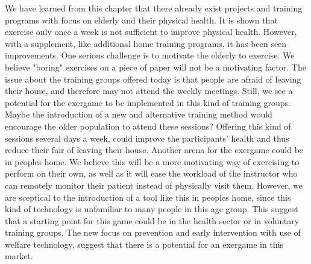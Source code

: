 We have learned from this chapter that there already exist projects and training programs with focus on elderly and their physical health. It is shown that exercise only once a week is not sufficient to improve physical health. However, with a supplement, like additional home training programs, it has been seen improvements. One serious challenge is to motivate the elderly to exercise. We believe "boring" exercises on a piece of paper will not be a motivating factor. The issue about the training groups offered today is that people are afraid of leaving their house, and therefore may not attend the weekly meetings. Still, we see a potential for the exergame to be implemented in this kind of training groups. Maybe the introduction of a new and alternative training method would encourage the older population to attend these sessions? Offering this kind of sessions several days a week, could improve the participants' health and thus reduce their fair of leaving their house.  Another arena for the exergame could be in peoples home. We believe this will be a more motivating way of exercising to perform on their own, as well as it will ease the workload of the instructor who can remotely monitor their patient instead of physically visit them. However, we are sceptical to the introduction of a tool like this in peoples home, since this kind of technology is unfamiliar to many people in this age group. This suggest that a starting point for this game could be in the health sector or in voluntary training groups.  The new focus on prevention and early intervention with use of welfare technology, suggest that there is a potential for an exergame in this market. 

